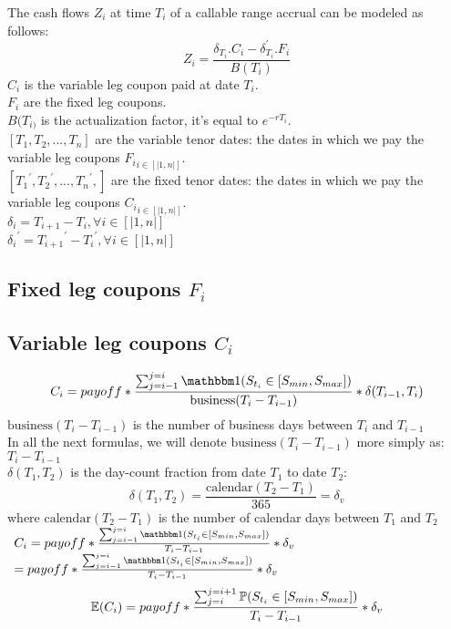 \documentclass[12pt]{article}
\begin{document}
				The cash flows $Z_{i}$ at time $T_i$ of a callable range accrual can be modeled as follows:
				\begin{equation}
					Z_i=\frac{\delta_{T_i} . C_i -\delta_{T_i}^{'} . F_i}{B(T_i)}
				\end{equation}
				$C_{i}$ is the variable leg coupon paid at date $T_i$.\\
				$F_{i}$ are the fixed leg coupons.\\
				$B(T_{i)}$ is the actualization factor, it's equal to $e^{-rT_{i}}$.\\
				$[T_{1}, T_{2},..., T_{n}]$ are the variable tenor dates: the dates in which we pay the variable leg coupons ${F_{i}}_{i \in [|1,n|]}$.\\
				$[{T_{1}}^{'}, {T_{2}}^{'},..., {T_{n}}^{'},]$ are the fixed tenor dates: the dates in which we pay the variable leg coupons ${C_{i}}_{i \in [|1,n|]}$.\\
				${\delta}_{i} = T_{i+1} - T_{i},  \forall i \in [|1,n|]$\\
				${{\delta}_{i}}^{'} = {T_{i+1}}^{'} - {T_{i}}^{'},  \forall i \in [|1,n|]$\\

				\subsection{Fixed leg coupons $F_{i}$}
				\subsection{Variable leg coupons $C_{i}$}
					\begin{equation*}
						C_i=payoff * \frac{\sum_{j=i - 1}^{j=i}\indicator (S_{t_i} \in [S_{min},S_{max}])}{\mbox{business}(T_i - T_{i-1})} * \delta(T_{i-1}, T_i)
					\end{equation*}
					$\mbox{business}(T_i - T_{i-1})$ is the number of business days between $T_{i}$ and $T_{i-1}$\\
					In all the next formulas, we will denote $\mbox{business}(T_i - T_{i-1})$ more simply as: $T_i - T_{i-1}$\\
					$\delta(T_1, T_2) $ is the day-count fraction from date $T_1$ to date $T_2$:\\
					$$
					\delta(T_1, T_2) = \frac{\mbox{calendar}(T_2 - T_1)}{365} = \delta_v
					$$
					where $\mbox{calendar}(T_2 - T_1)$ is the number of calendar days between $T_1$ and $T_2$\\
					
					$\begin{array}{lcl}
					C_i=payoff * \frac{\sum_{j=i - 1}^{j=i}\indicator (S_{t_i} \in [S_{min},S_{max}])}{T_i - T_{i-1}} * \delta_v \\

					=payoff * \frac{\sum_{j=i - 1}^{j=i}\indicator (S_{t_i} \in [S_{min},S_{max}])}{T_i - T_{i-1}} * \delta_v
					\end{array}$
					\begin{equation*}
					\E(C_i)=payoff * \frac{\sum_{j=i}^{j=i+1} \PP (S_{t_i} \in [S_{min},S_{max}])}{T_i - T_{i-1}} * \delta_v
					\end{equation*}
					
\end{document}
